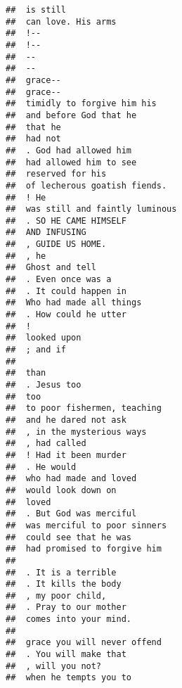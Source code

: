 \documentclass[]{article}
\begin{document}
\begin{verbatim}
##  is still                                
##  can love. His arms                      
##  !--                                     
##  !--                                     
##  --                                      
##  --                                      
##  grace--                                 
##  grace--                                 
##  timidly to forgive him his              
##  and before God that he                  
##  that he                                 
##  had not                                 
##  . God had allowed him                   
##  had allowed him to see                  
##  reserved for his                        
##  of lecherous goatish fiends.            
##  ! He                                    
##  was still and faintly luminous          
##  . SO HE CAME HIMSELF                    
##  AND INFUSING                            
##  , GUIDE US HOME.                        
##  , he                                    
##  Ghost and tell                          
##  . Even once was a                       
##  . It could happen in                    
##  Who had made all things                 
##  . How could he utter                    
##  !                                       
##  looked upon                             
##  ; and if                                
##                                          
##  than                                    
##  . Jesus too                             
##  too                                     
##  to poor fishermen, teaching             
##  and he dared not ask                    
##  , in the mysterious ways                
##  , had called                            
##  ! Had it been murder                    
##  . He would                              
##  who had made and loved                  
##  would look down on                      
##  loved                                   
##  . But God was merciful                  
##  was merciful to poor sinners            
##  could see that he was                   
##  had promised to forgive him             
##                                          
##  . It is a terrible                      
##  . It kills the body                     
##  , my poor child,                        
##  . Pray to our mother                    
##  comes into your mind.                   
##                                          
##  grace you will never offend             
##  . You will make that                    
##  , will you not?                         
##  when he tempts you to                   

\end{verbatim}
\end{document}
